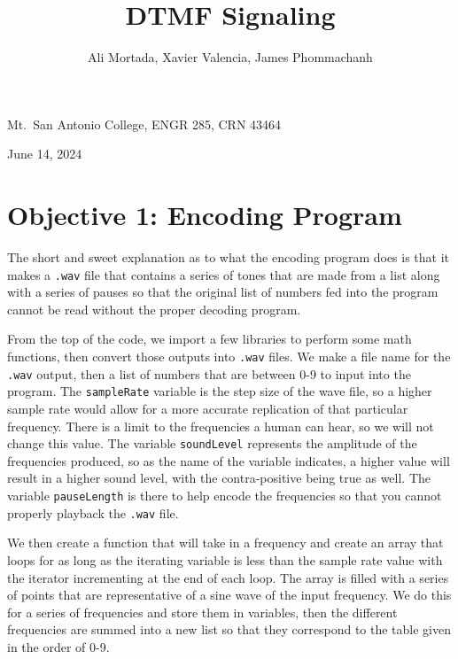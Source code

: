 \documentclass[12pt]{iopart}
\begin{document}
\title{DTMF Signaling}
\author{Ali Mortada, Xavier Valencia, James Phommachanh}
\vspace{10pt}
\begin{indented}
  \item[]Mt.~San Antonio College, ENGR 285, CRN 43464
  \item[]June 14, 2024
\end{indented}
\newpage

\section{Objective 1: Encoding Program}


The short and sweet explanation as to what the encoding program does is that it makes a \verb|.wav| file that contains a series of tones that are made from a list along with a series of pauses so that the original list of numbers fed into the program cannot be read without the proper decoding program.

From the top of the code, we import a few libraries to perform some math functions, then convert those outputs into \verb|.wav| files. 
We make a file name for the \verb|.wav| output, then a list of numbers that are between 0-9 to input into the program. 
The \verb|sampleRate| variable is the step size of the wave file, so a higher sample rate would allow for a more accurate replication of that particular frequency. 
There is a limit to the frequencies a human can hear, so we will not change this value. 
The variable \verb|soundLevel| represents the amplitude of the frequencies produced, so as the name of the variable indicates, a higher value will result in a higher sound level, with the contra-positive being true as well. 
The variable \verb|pauseLength| is there to help encode the frequencies so that you cannot properly playback the \verb|.wav| file.

We then create a function that will take in a frequency and create an array that loops for as long as the iterating variable is less than the sample rate value with the iterator incrementing at the end of each loop.
The array is filled with a series of points that are representative of a sine wave of the input frequency. 
We do this for a series of frequencies and store them in variables, then the different frequencies are summed into a new list so that they correspond to the table given in the order of 0-9. 
\end{document}
